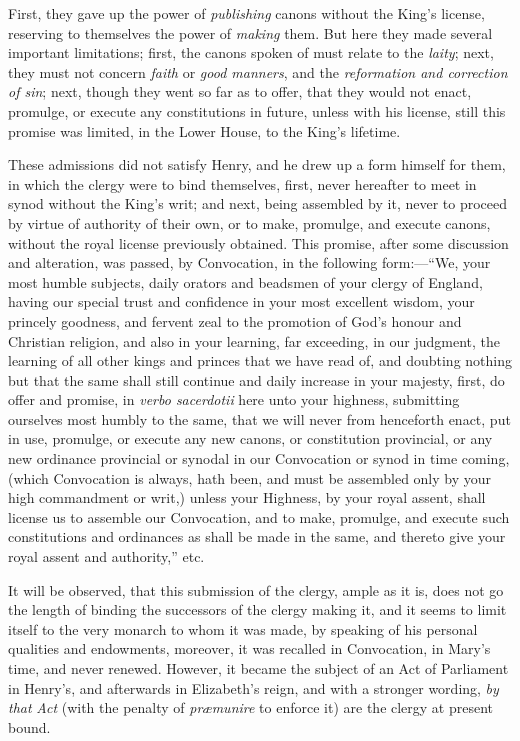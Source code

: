 First, they gave up the power
of \emph{publishing} canons without the King's license, reserving to
themselves the power of \emph{making} them. But here they made several
important limitations; first, the canons spoken of must relate to the \emph{laity};
next, they must not concern \emph{faith} or \emph{good manners}, and
the \emph{reformation and correction of sin}; next, though they went
so far as to offer, that they would not enact, promulge, or execute
any constitutions in future, unless with his license, still this
promise was limited, in the Lower House, to the King's lifetime.

These admissions did not
satisfy Henry, and he drew up a form himself for them, in which the
clergy were to bind themselves, first, never hereafter to meet in
synod without the King's writ; and next, being assembled by it, never
to proceed by virtue of authority of their own, or to make, promulge, and execute canons, without the royal license previously
obtained. This promise, after some discussion and alteration, was
passed, by Convocation, in the following form:—``We, your most humble
subjects, daily orators and beadsmen of your clergy of England, having
our special trust and confidence in your most excellent wisdom, your
princely goodness, and fervent zeal to the promotion of God's honour
and Christian religion, and also in your learning, far exceeding, in
our judgment, the learning of all other kings and princes that we have
read of, and doubting nothing but that the same shall still continue
and daily increase in your majesty, first, do offer and promise, in \emph{verbo
sacerdotii} here unto your highness, submitting ourselves most
humbly to the same, that we will never from henceforth enact, put in
use, promulge, or execute any new canons, or constitution provincial,
or any new ordinance provincial or synodal in our Convocation or synod
in time coming, (which Convocation is always, hath been, and must be
assembled only by your high commandment or writ,) unless your
Highness, by your royal assent, shall license us to assemble our
Convocation, and to make, promulge, and execute such constitutions and
ordinances as shall be made in the same, and thereto give your royal
assent and authority,'' etc.

It will be observed, that this
submission of the clergy, ample as it is, does not go the length of
binding the successors of the clergy making it, and it seems to limit
itself to the very monarch to whom it was made, by speaking of his
personal qualities and endowments, moreover, it was recalled in
Convocation, in Mary's time, and never renewed. However, it became the
subject of an Act of Parliament in Henry's, and afterwards in
Elizabeth's reign, and with a stronger wording, \emph{by that} \emph{Act}
(with the penalty of \emph{præmunire} to enforce it) are the clergy
at present bound.

